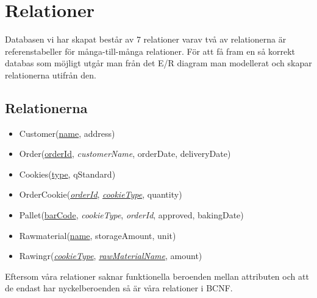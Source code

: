\section{Relationer}

Databasen vi har skapat består av 7 relationer varav två av relationerna är referenstabeller för många-till-många relationer. För att få fram en så korrekt databas som möjligt utgår man från det E/R diagram man modellerat och skapar relationerna utifrån den.

\subsection{Relationerna}
\begin{itemize}
	
\item{Customer(\underline{name}, address)}
\item{Order(\underline{orderId}, \emph{customerName}, orderDate, deliveryDate)}
\item{Cookies(\underline{type}, qStandard)}
\item{OrderCookie(\underline{\emph{orderId}}, \underline{\emph{cookieType}}, quantity)}
\item{Pallet(\underline{barCode}, \emph{cookieType}, \emph{orderId}, approved, bakingDate)}
\item{Rawmaterial(\underline{name}, storageAmount, unit)}
\item{Rawingr(\underline{\emph{cookieType}}, \underline{\emph{rawMaterialName}}, amount)}

\end{itemize}

Eftersom våra relationer saknar funktionella beroenden mellan attributen och att de endast har nyckelberoenden så är våra relationer i BCNF. 
